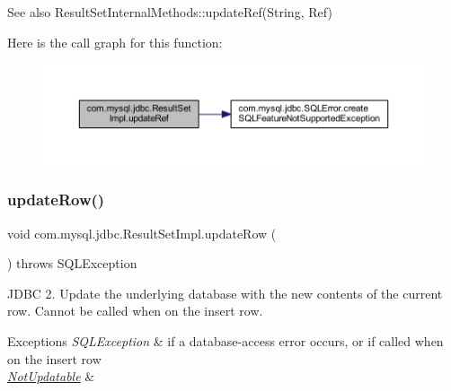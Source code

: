 \begin{DoxySeeAlso}{See also}
Result\+Set\+Internal\+Methods\+::update\+Ref(\+String, Ref) 
\end{DoxySeeAlso}
Here is the call graph for this function\+:
\nopagebreak
\begin{figure}[H]
\begin{center}
\leavevmode
\includegraphics[width=350pt]{classcom_1_1mysql_1_1jdbc_1_1_result_set_impl_a8ccc94c8e83c3c560779aef0d9bab1ae_cgraph}
\end{center}
\end{figure}
\mbox{\label{classcom_1_1mysql_1_1jdbc_1_1_result_set_impl_a2842d32292d023aaeeafedeed3322981}} 
\subsubsection{\texorpdfstring{update\+Row()}{updateRow()}}
{\footnotesize\ttfamily void com.\+mysql.\+jdbc.\+Result\+Set\+Impl.\+update\+Row (\begin{DoxyParamCaption}{ }\end{DoxyParamCaption}) throws S\+Q\+L\+Exception}

J\+D\+BC 2. Update the underlying database with the new contents of the current row. Cannot be called when on the insert row.


\begin{DoxyExceptions}{Exceptions}
{\em S\+Q\+L\+Exception} & if a database-\/access error occurs, or if called when on the insert row \\
\hline
{\em \mbox{\hyperlink{classcom_1_1mysql_1_1jdbc_1_1_not_updatable}{Not\+Updatable}}} & \\
\hline
\end{DoxyExceptions}
\mbox{\label{classcom_1_1mysql_1_1jdbc_1_1_result_set_impl_a4856eb4ba75f201ec478c09b5e7af025}} 
